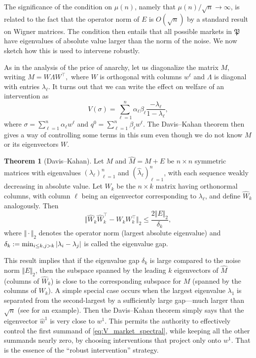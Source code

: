 \documentclass{notices}
\theoremstyle{definition}\newtheorem{problem}{Problem}
\theoremstyle{definition} \newtheorem{remark}{Remark}
\theoremstyle{definition} \newtheorem{claim}{Claim}
\renewcommand{\min}{\operatornamewithlimits{min}}
\theoremstyle{definition} \newtheorem{thm}{Theorem}
\theoremstyle{definition} \newtheorem*{thmNoNum}{Theorem}
\theoremstyle{definition} \newtheorem{definition}{Definition}
\theoremstyle{definition} \theoremstyle{remark}
\theoremstyle{definition} \newtheorem{note}{Note}
\theoremstyle{definition} \newtheorem{notation}{Notation}
\theoremstyle{definition} \theoremstyle{plain}
\theoremstyle{definition} \newtheorem{condition}{Condition}
\theoremstyle{definition} \newtheorem{lem}{Lemma}
\theoremstyle{definition} \newtheorem{corollary}{Corollary}
\theoremstyle{definition} \newtheorem{prop}{Proposition}
\theoremstyle{definition} \newtheorem{ax}{Axiom}
\theoremstyle{definition} \newtheorem{assumption}{Assumption}
\theoremstyle{definition} \newtheorem{example}{Example}
\theoremstyle{definition} \newtheorem{rmk}{Remark}
\theoremstyle{definition} \newtheorem{res}{Result}
\theoremstyle{definition} \newtheorem{que}{Question}
\theoremstyle{definition} \newtheorem{conjecture}{Conjecture}
\theoremstyle{definition}
\begin{document}
The significance of the condition on $\mu(n)$, namely that $\mu(n)/\sqrt{n} \to \infty$, is related to the fact that the operator norm of $E$ is $O(\sqrt{n})$ by a standard result on Wigner matrices. The condition then entails that all possible markets in $\mathfrak{P}$ have eigenvalues of absolute value larger than the norm of the noise. We now sketch how this is used to intervene robustly.

As in the analysis of the price of anarchy, let us diagonalize the matrix \( M \), writing
$M = W \Lambda W^\top,$ where \( W \) is orthogonal with columns $w^\ell$ and \( \Lambda \) is diagonal with entries \( \lambda_\ell \). It turns out that we can write the effect on welfare of an intervention as \begin{equation} \label{eq:V_market_spectral}
V(\sigma) = \sum_{\ell=1}^n \alpha_\ell \beta_\ell \frac{-\lambda_\ell}{1 - \lambda_\ell},
\end{equation}
where \( \sigma = \sum_{\ell=1}^n \alpha_\ell w^\ell \) and  \( q^0 = \sum_{\ell=1}^n \beta_\ell w^\ell \). 
The Davis--Kahan theorem then gives a way of controlling some terms in this sum even though we do not know $M$ or its eigenvectors $W$.
\begin{thmNoNum}[Davis--Kahan]
Let $M$ and $\widehat{M} = M + E$ be $n \times n$ symmetric matrices with eigenvalues $(\lambda_\ell)_{\ell=1}^n$ and $(\widehat{\lambda}_\ell)_{\ell=1}^n$, with each sequence weakly decreasing in absolute value. Let $W_k$ be the $n \times k$ matrix having orthonormal columns, with column $\ell$ being an eigenvector corresponding to $\lambda_\ell$, and define $\widehat{W}_k$ analogously. Then
\[
\Vert \widehat{W}_k \widehat{W}_k^\top - W_k W_k^\top \Vert_2 \leq \frac{2 \Vert E \Vert_2}{\delta_k}, 
\]
where $\Vert \cdot \Vert_2$ denotes the operator norm (largest absolute eigenvalue) and $\delta_k := \min_{i \leq k, j > k} |\lambda_i - \lambda_j|$ is called the eigenvalue gap.
\end{thmNoNum}

This result implies that if the eigenvalue gap $\delta_k$  is large compared to the noise norm $\Vert E \Vert_2$, then the subspace spanned by the leading $k$ eigenvectors of $\widehat{M}$ (columns of $\widehat{W}_k$) is close to the corresponding subspace for $M$ (spanned by the columns of $W_k$).
A simple special case occurs when the largest eigenvalue $\lambda_1$ is separated from the second-largest by a sufficiently large gap---much larger than $\sqrt{n}$ (see  for an example). Then the Davis--Kahan theorem simply says that the eigenvector $\widehat{w}^1$ is very close to $w^1$. This permits the authority to effectively control the first summand of \cref{eq:V_market_spectral}, while keeping all the other summands nearly zero, by choosing interventions that project only onto $w^1$. That is the essence of the ``robust intervention'' strategy. 
\end{document}
